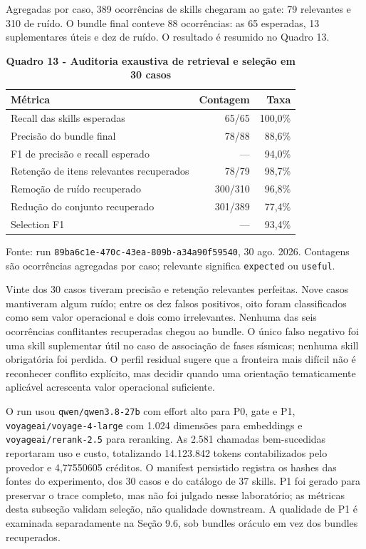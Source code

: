 \documentclass[12pt,a4paper]{article}
\begin{document}
Agregadas por caso, 389 ocorrências de skills chegaram ao gate: 79 relevantes e 310 de ruído. O bundle final conteve 88 ocorrências: as 65 esperadas, 13 suplementares úteis e dez de ruído. O resultado é resumido no Quadro 13.

\begin{table}[H]
\centering
\caption*{\textbf{Quadro 13 - Auditoria exaustiva de retrieval e seleção em 30 casos}}
\small
\renewcommand{\arraystretch}{1.12}
\begin{tabularx}{\linewidth}{|Y|r|r|}
\hline
\textbf{Métrica} & \textbf{Contagem} & \textbf{Taxa} \\
\hline
Recall das skills esperadas & 65/65 & 100,0\% \\
\hline
Precisão do bundle final & 78/88 & 88,6\% \\
\hline
F1 de precisão e recall esperado & --- & 94,0\% \\
\hline
Retenção de itens relevantes recuperados & 78/79 & 98,7\% \\
\hline
Remoção de ruído recuperado & 300/310 & 96,8\% \\
\hline
Redução do conjunto recuperado & 301/389 & 77,4\% \\
\hline
Selection F1 & --- & 93,4\% \\
\hline
\end{tabularx}
\par\smallskip\raggedright\small Fonte: run \texttt{89ba6c1e-470c-43ea-809b-a34a90f59540}, 30 ago. 2026. Contagens são ocorrências agregadas por caso; relevante significa \texttt{expected} ou \texttt{useful}.
\end{table}

Vinte dos 30 casos tiveram precisão e retenção relevantes perfeitas. Nove casos mantiveram algum ruído; entre os dez falsos positivos, oito foram classificados como sem valor operacional e dois como irrelevantes. Nenhuma das seis ocorrências conflitantes recuperadas chegou ao bundle. O único falso negativo foi uma skill suplementar útil no caso de associação de fases sísmicas; nenhuma skill obrigatória foi perdida. O perfil residual sugere que a fronteira mais difícil não é reconhecer conflito explícito, mas decidir quando uma orientação tematicamente aplicável acrescenta valor operacional suficiente.

O run usou \nolinkurl{qwen/qwen3.8-27b} com effort alto para P0, gate e P1, \nolinkurl{voyageai/voyage-4-large} com 1.024 dimensões para embeddings e \nolinkurl{voyageai/rerank-2.5} para reranking. As 2.581 chamadas bem-sucedidas reportaram uso e custo, totalizando 14.123.842 tokens contabilizados pelo provedor e 4,77550605 créditos. O manifest persistido registra os hashes das fontes do experimento, dos 30 casos e do catálogo de 37 skills. P1 foi gerado para preservar o trace completo, mas não foi julgado nesse laboratório; as métricas desta subseção validam seleção, não qualidade downstream. A qualidade de P1 é examinada separadamente na Seção 9.6, sob bundles oráculo em vez dos bundles recuperados.
\end{document}
